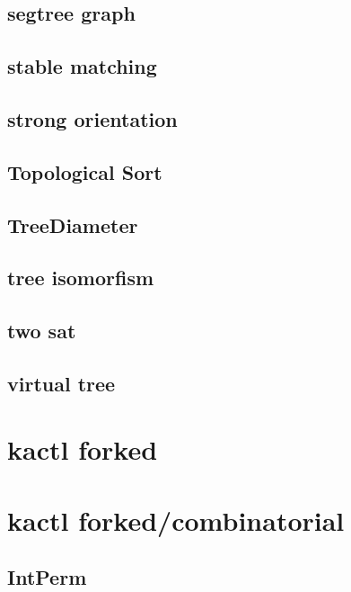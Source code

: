 \subsection{segtree graph}
\raggedbottom
\hrulefill
\subsection{stable matching}
\raggedbottom
\hrulefill
\subsection{strong orientation}
\raggedbottom
\hrulefill
\subsection{Topological Sort}
\raggedbottom
\hrulefill
\subsection{TreeDiameter}
\raggedbottom
\hrulefill
\subsection{tree isomorfism}
\raggedbottom
\hrulefill
\subsection{two sat}
\raggedbottom
\hrulefill
\subsection{virtual tree}
\raggedbottom
\hrulefill

\section{kactl forked}

\section{kactl forked/combinatorial}
\subsection{IntPerm}
\raggedbottom
\hrulefill
